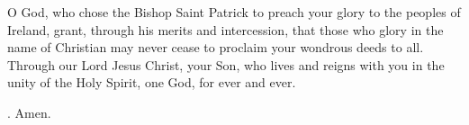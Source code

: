 \lettrine[lines=3]{O}{} God, who chose the Bishop Saint Patrick
to preach your glory to the peoples of Ireland,
grant, through his merits and intercession,
that those who glory in the name of Christian
may never cease to proclaim your wondrous deeds to all.
Through our Lord Jesus Christ, your Son,
who lives and reigns with you in the unity of the Holy Spirit,
one God, for ever and ever. \par \Rbar. Amen.
